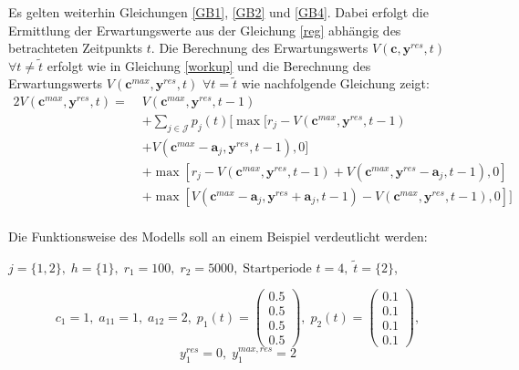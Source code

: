 Es gelten weiterhin Gleichungen \eqref{GB1}, \eqref{GB2} und \eqref{GB4}. Dabei erfolgt die Ermittlung der Erwartungswerte aus der Gleichung \eqref{reg} abhängig des betrachteten Zeitpunkts $t$. Die Berechnung des Erwartungswerts $V(\textbf{c}, \textbf{y}^{res}, t)$ $\forall t\neq\tilde{t}$ erfolgt wie in Gleichung \eqref{workup} und die Berechnung des Erwartungswerts $V(\textbf{c}^{max}, \textbf{y}^{res}, t)$ $\forall t=\tilde{t}$ wie nachfolgende Gleichung zeigt:
\begin{alignat*}{2}
 V(\textbf{c}^{max}, \textbf{y}^{res}, t) = \;& V(\textbf{c}^{max}, \textbf{y}^{res}, t-1)\\
&+ \sum_{j \in \mathcal{J}}p_{j}(t)[\max[r_{j} - V(\textbf{c}^{max}, \textbf{y}^{res}, t-1)\\
&+ V(\textbf{c}^{max}-\textbf{a}_j, \textbf{y}^{res}, t-1),0] \\
&+ \max[r_{j} - V(\textbf{c}^{max}, \textbf{y}^{res}, t-1) + V(\textbf{c}^{max}, \textbf{y}^{res}-\textbf{a}_j, t-1),0]\\
&+ \max[V(\textbf{c}^{max}-\textbf{a}_j, \textbf{y}^{res}+\textbf{a}_j, t-1) - V(\textbf{c}^{max}, \textbf{y}^{res}, t-1) ,0]]\\
\end{alignat*}

Die Funktionsweise des Modells soll an einem Beispiel verdeutlicht werden:
\begin{center}
$j = \{1, 2\}, \; h = \{1\}, \; r_{1} = 100, \; r_{2} = 5000, \; \text{Startperiode } t=4, \; \tilde{t}=\{2\} $,
\end{center}
\[
    c_{1}=1, \;
    a_{11}=1, \;
     a_{12}=2, \;
     p_{1}(t)=\begin{pmatrix} 0.5\\ 0.5\\ 0.5\\ 0.5  \end{pmatrix}, \;
     p_{2}(t)=\begin{pmatrix} 0.1\\ 0.1\\ 0.1\\ 0.1  \end{pmatrix},
  \]
  \[
    y_{1}^{res}= 0, \;
    y_{1}^{max,res}=2
      \]
      

